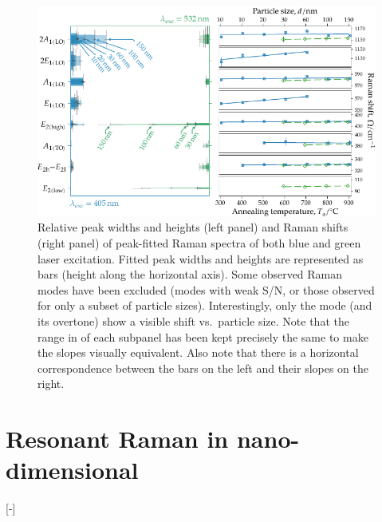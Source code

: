 \documentclass[webedition,openright,titles,swedish,english]{LuaUUThesis}\usepackage[]{graphicx}\usepackage[]{xcolor}
\newenvironment{knitrout}{}{} %
\newcommand{\vs}{vs.}
\begin{document}
\begin{figure}[tbp]
\centering
\begin{knitrout}\scriptsize
{}\color{fgcolor}

{\centering \includegraphics[width=4.72in]{figure/0525P-fig-bluegreen-bars_shifts-1} 

}


\end{knitrout}
\caption[Fitted peak parameters of non-resonant Raman spectra]{%
   Relative peak widths and heights (left panel) and Raman shifts (right panel) of peak-fitted
   Raman spectra of both blue and green laser excitation.
   Fitted peak widths and heights are represented as bars (height along the horizontal axis).
   Some observed Raman modes have been excluded (modes with weak S/N, or those
   observed for only a subset of particle sizes).
   Interestingly, only the  mode (and its overtone) show a visible shift
   \vs\ particle size.
   Note that the range in  of each subpanel has been kept precisely
   the same to make the slopes visually equivalent.
   Also note that there is a horizontal correspondence between the bars on the left
   and their slopes on the right.}
\label{fig:P25-bluegreenraman-bars+shifts}
\end{figure}



% 

\section[Resonant Raman in nano-dimensional ZnO]{Resonant Raman in nano-dimensional \ZnO}
\label{results:P25-resonant-Raman}
[-\baselineskip]
\end{document}
